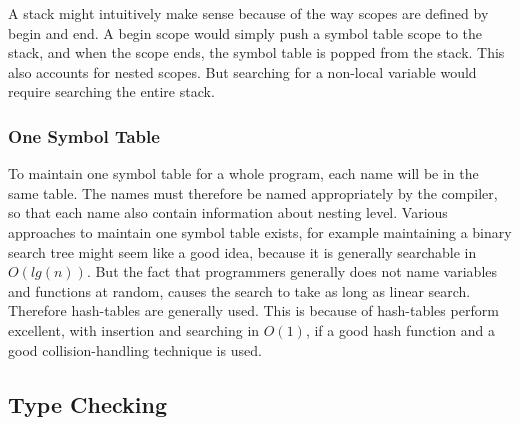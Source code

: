 A stack might intuitively make sense because of the way scopes are defined by begin and end. A begin scope would simply push a symbol table scope to the stack, and when the scope ends, the symbol table is popped from the stack. This also accounts for nested scopes. But searching for a non-local variable would require searching the entire stack. 

\subsubsection*{One Symbol Table}
To maintain one symbol table for a whole program, each name will be in the same table. The names must therefore be named appropriately by the compiler, so that each name also contain information about nesting level. Various approaches to maintain one symbol table exists, for example maintaining a binary search tree might seem like a good idea, because it is generally searchable in $O(lg(n))$. But the fact that programmers generally does not name variables and functions at random, causes the search to take as long as linear search. Therefore hash-tables are generally used. This is because of hash-tables perform excellent, with insertion and searching in $O(1)$, if a good hash function and a good collision-handling technique is used.
\subsection{Type Checking}

